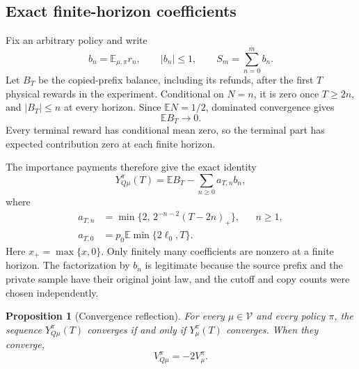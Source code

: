 \documentclass[11pt]{article}
\newtheorem{proposition}[theorem]{Proposition}
\theoremstyle{definition}
\theoremstyle{remark}
\newcommand{\V}{\mathcal V}
\newcommand{\Exp}{\mathbb E}
\begin{document}
\subsection{Exact finite-horizon coefficients}

Fix an arbitrary policy and write
\begin{equation}
  b_n=\Exp_{\mu,\pi}r_n,\qquad |b_n|\le1,
  \qquad S_m=\sum_{n=0}^m b_n.
  \label{eq:source-sequence}
\end{equation}
Let $B_T$ be the copied-prefix balance, including its refunds, after
the first $T$ physical rewards in the experiment.  Conditional on
$N=n$, it is zero once $T\ge2n$, and $|B_T|\le n$ at every horizon.
Since $\Exp N=1/2$, dominated convergence gives
\begin{equation}
  \Exp B_T\longrightarrow0.
  \label{eq:refund-vanishes}
\end{equation}
Every terminal reward has conditional mean zero, so the terminal part
has expected contribution zero at each finite horizon.

The importance payments therefore give the exact identity
\begin{equation}
  Y_{Q\mu}^{\pi}(T)=\Exp B_T-\sum_{n\ge0}a_{T,n}b_n,
  \label{eq:q-decomposition}
\end{equation}
where
\begin{align}
  a_{T,n}&=\min\{2,\,2^{-n-2}(T-2n)_+\}, &&n\ge1,
     \label{eq:q-coefficients}\\
  a_{T,0}&=p_0\Exp\min\{2\ell_0,T\}. &&
     \label{eq:q-coefficient-zero}
\end{align}
Here $x_+=\max\{x,0\}$.  Only finitely many coefficients are nonzero
at a finite horizon.  The factorization by $b_n$ is legitimate because
the source prefix and the private sample have their original joint
law, and the cutoff and copy counts were chosen independently.

\begin{proposition}[Convergence reflection]
\label{prop:q-convergence}
For every $\mu\in\V$ and every policy $\pi$, the sequence
$Y_{Q\mu}^{\pi}(T)$ converges if and only if $Y_\mu^\pi(T)$ converges.
When they converge,
\[
  V_{Q\mu}^{\pi}=-2V_\mu^\pi.
\]
\end{proposition}
\end{document}
